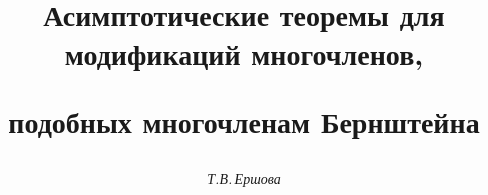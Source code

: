 

 


% 


 


\newcommand{\tts}[1]{} 


 




 


\setcounter{page}{9} 












 


\author{\it Т.В.\,Ершова} 




\title{Асимптотические теоремы для модификаций многочленов, 


подобных многочленам Бернштейна} 


 


\date{} 




\pagestyle{plain} %


 




\maketitle 


\label{begin} 


